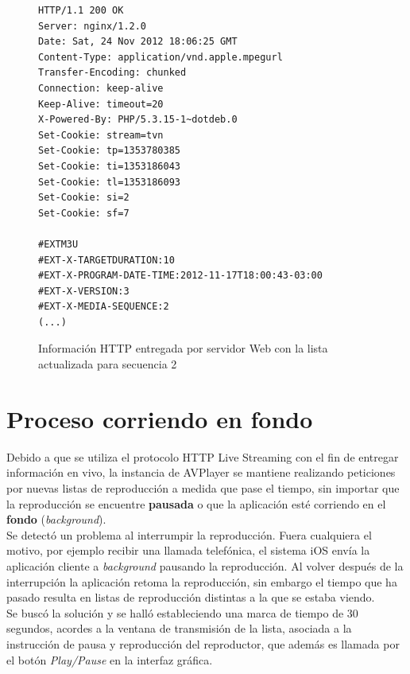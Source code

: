 \begin{figure}[H]
	\centering
\begin{lstlisting}
HTTP/1.1 200 OK
Server: nginx/1.2.0
Date: Sat, 24 Nov 2012 18:06:25 GMT
Content-Type: application/vnd.apple.mpegurl
Transfer-Encoding: chunked
Connection: keep-alive
Keep-Alive: timeout=20
X-Powered-By: PHP/5.3.15-1~dotdeb.0
Set-Cookie: stream=tvn
Set-Cookie: tp=1353780385
Set-Cookie: ti=1353186043
Set-Cookie: tl=1353186093
Set-Cookie: si=2
Set-Cookie: sf=7

#EXTM3U
#EXT-X-TARGETDURATION:10
#EXT-X-PROGRAM-DATE-TIME:2012-11-17T18:00:43-03:00
#EXT-X-VERSION:3
#EXT-X-MEDIA-SEQUENCE:2
(...)
\end{lstlisting}
\caption{Información HTTP entregada por servidor Web con la lista actualizada para secuencia 2}
\label{lst:sequence2}
\end{figure}





\section{Proceso corriendo en fondo} %

Debido a que se utiliza el protocolo HTTP Live Streaming con el fin de entregar información en vivo, la instancia de AVPlayer se mantiene realizando peticiones por nuevas listas de reproducción a medida que pase el tiempo, sin importar que la reproducción se encuentre \textbf{pausada} o que la aplicación esté corriendo en el \textbf{fondo} (\textit{background}).\\

Se detectó un problema al interrumpir la reproducción. Fuera cualquiera el motivo, por ejemplo recibir una llamada telefónica, el sistema iOS envía la aplicación cliente a \textit{background} pausando la reproducción. Al volver después de la interrupción la aplicación retoma la reproducción, sin embargo el tiempo que ha pasado resulta en listas de reproducción distintas a la que se estaba viendo.\\

Se buscó la solución y se halló estableciendo una marca de tiempo de 30 segundos, acordes a la ventana de transmisión de la lista, asociada a la instrucción de pausa y reproducción del reproductor, que además es llamada por el botón \textit{Play/Pause} en la interfaz gráfica.\\

